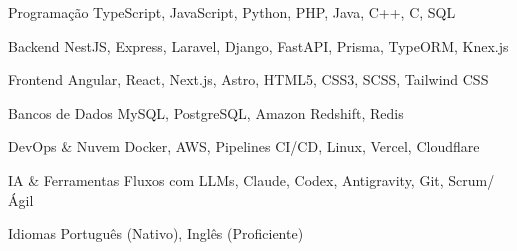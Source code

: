 

\begin{cvskills}

  \cvskill
    {Programação} %
    {TypeScript, JavaScript, Python, PHP, Java, C++, C, SQL} %

  \cvskill
    {Backend} %
    {NestJS, Express, Laravel, Django, FastAPI, Prisma, TypeORM, Knex.js} %

  \cvskill
    {Frontend} %
    {Angular, React, Next.js, Astro, HTML5, CSS3, SCSS, Tailwind CSS} %

  \cvskill
    {Bancos de Dados} %
    {MySQL, PostgreSQL, Amazon Redshift, Redis} %

  \cvskill
    {DevOps \& Nuvem} %
    {Docker, AWS, Pipelines CI/CD, Linux, Vercel, Cloudflare} %

  \cvskill
    {IA \& Ferramentas} %
    {Fluxos com LLMs, Claude, Codex, Antigravity, Git, Scrum/Ágil} %

  \cvskill
    {Idiomas} %
    {Português (Nativo), Inglês (Proficiente)} %

\end{cvskills}
